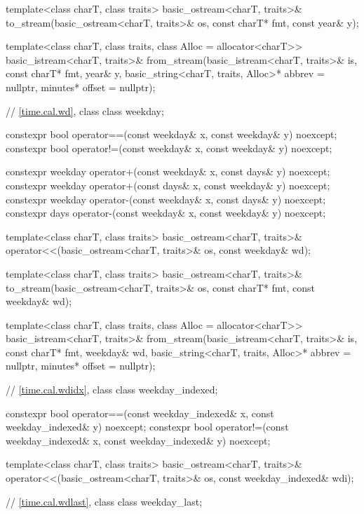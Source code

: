 \begin{codeblock}
{{    template<class charT, class traits>
      basic_ostream<charT, traits>&
        to_stream(basic_ostream<charT, traits>& os, const charT* fmt, const year& y);

    template<class charT, class traits, class Alloc = allocator<charT>>
      basic_istream<charT, traits>&
        from_stream(basic_istream<charT, traits>& is, const charT* fmt,
                    year& y, basic_string<charT, traits, Alloc>* abbrev = nullptr,
                    minutes* offset = nullptr);

    // \ref{time.cal.wd}, class 
    class weekday;

    constexpr bool operator==(const weekday& x, const weekday& y) noexcept;
    constexpr bool operator!=(const weekday& x, const weekday& y) noexcept;

    constexpr weekday operator+(const weekday& x, const days&    y) noexcept;
    constexpr weekday operator+(const days&    x, const weekday& y) noexcept;
    constexpr weekday operator-(const weekday& x, const days&    y) noexcept;
    constexpr days    operator-(const weekday& x, const weekday& y) noexcept;

    template<class charT, class traits>
      basic_ostream<charT, traits>&
        operator<<(basic_ostream<charT, traits>& os, const weekday& wd);

    template<class charT, class traits>
      basic_ostream<charT, traits>&
        to_stream(basic_ostream<charT, traits>& os, const charT* fmt, const weekday& wd);

    template<class charT, class traits, class Alloc = allocator<charT>>
      basic_istream<charT, traits>&
        from_stream(basic_istream<charT, traits>& is, const charT* fmt,
                    weekday& wd, basic_string<charT, traits, Alloc>* abbrev = nullptr,
                    minutes* offset = nullptr);

    // \ref{time.cal.wdidx}, class 
    class weekday_indexed;

    constexpr bool operator==(const weekday_indexed& x, const weekday_indexed& y) noexcept;
    constexpr bool operator!=(const weekday_indexed& x, const weekday_indexed& y) noexcept;

    template<class charT, class traits>
      basic_ostream<charT, traits>&
        operator<<(basic_ostream<charT, traits>& os, const weekday_indexed& wdi);

    // \ref{time.cal.wdlast}, class 
    class weekday_last;

}}
\end{codeblock}
